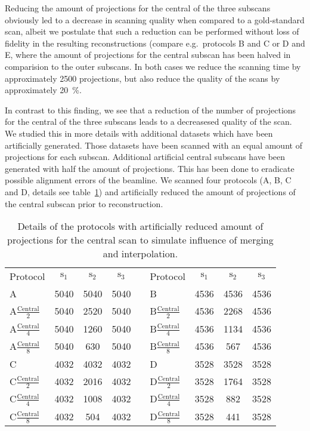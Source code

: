 Reducing the amount of projections for the central of the three subscans obviously led to a decrease in scanning quality when compared to a gold-standard scan, albeit we postulate that such a reduction can be performed without loss of fidelity in the resulting reconstructions (compare e.g.\  protocols B and C or D and E, where the amount of projections for the central subscan has been halved in comparision to the outer subscans. In both cases we reduce the scanning time by approximately 2500 projections, but also reduce the quality of the scans by approximately \SI{20}{\percent}.

In contrast to this finding, we see that a reduction of the number of projections for the central of the three subscans leads to a decreasesed quality of the scan. We studied this in more details with additional datasets which have been artificially generated. Those datasets have been scanned with an equal amount of projections for each subscan. Additional artificial central subscans have been generated with half the amount of projections. This has been done to eradicate possible alignment errors of the beamline. We scanned four protocols (A, B, C and D, details see table~\ref{tab:abcd}) and artificially reduced the amount of projections of the central subscan prior to reconstruction. 

\begin{table}
	\centering
	\caption{Details of the protocols with artificially reduced amount of projections for the central scan to simulate influence of merging and interpolation.}
	\begin{tabular}{lcccclccc}
		Protocol & $\textrm{s}_{1}$ & $\textrm{s}_{2}$ & $\textrm{s}_{3}$ &  &  Protocol & $\textrm{s}_{1}$ & $\textrm{s}_{2}$ & $\textrm{s}_{3}$ \\
		A & 5040 & 5040 & 5040 &  &  B & 4536 & 4536 & 4536 \\
		A$\frac{\textrm{Central}}{2}$ & 5040 & 2520 & 5040 &  & B$\frac{\textrm{Central}}{2}$ & 4536 & 2268 & 4536 \\
		A$\frac{\textrm{Central}}{4}$ & 5040 & 1260 & 5040 &  & B$\frac{\textrm{Central}}{4}$ & 4536 & 1134 & 4536 \\
		A$\frac{\textrm{Central}}{8}$ & 5040 & 630 & 5040 &  & B$\frac{\textrm{Central}}{8}$ & 4536 & 567 & 4536 \\
		\hline
		C & 4032 & 4032 & 4032 &  &  D & 3528 & 3528 & 3528 \\
		C$\frac{\textrm{Central}}{2}$ & 4032 & 2016 & 4032 &  & D$\frac{\textrm{Central}}{2}$ & 3528 & 1764 & 3528 \\
		C$\frac{\textrm{Central}}{4}$ & 4032 & 1008 & 4032 &  & D$\frac{\textrm{Central}}{4}$ & 3528 & 882 & 3528 \\
		C$\frac{\textrm{Central}}{8}$ & 4032 & 504 & 4032 &  & D$\frac{\textrm{Central}}{8}$ & 3528 & 441 & 3528 \\
	\end{tabular}  
	\label{tab:abcd}
\end{table}


